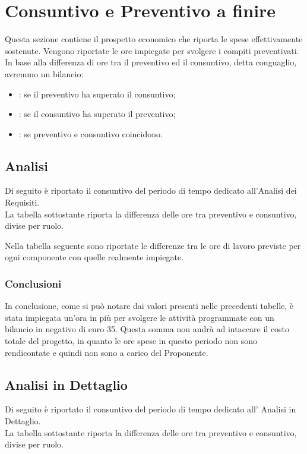 \section{Consuntivo e Preventivo a finire}
Questa sezione contiene il prospetto economico che riporta le spese effettivamente sostenute. Vengono riportate le ore impiegate per svolgere i compiti preventivati. In base alla differenza di ore tra il preventivo ed il consuntivo, detta conguaglio, avremmo un bilancio:
\begin{itemize}
\item {}: se il preventivo ha superato il consuntivo;
\item {}: se il consuntivo ha superato il preventivo;
\item {}: se preventivo e consuntivo coincidono.
\end{itemize}
\subsection{Analisi}
Di seguito è riportato il consuntivo del periodo di tempo dedicato all'Analisi dei Requisiti.\\
La tabella sottostante riporta la differenza delle ore tra preventivo e consuntivo, divise per ruolo.


Nella tabella seguente sono riportate le differenze tra le ore di lavoro previste per ogni componente con quelle realmente impiegate.


\subsubsection{Conclusioni}
In conclusione, come si può notare dai valori presenti nelle precedenti tabelle, è stata impiegata un'ora in più per svolgere le attività programmate con un bilancio in negativo di euro 35. Questa somma non andrà ad intaccare il costo totale del progetto, in quanto le ore spese in questo periodo non sono rendicontate e quindi non sono a carico del Proponente.

\subsection{Analisi in Dettaglio}
Di seguito è riportato il consuntivo del periodo di tempo dedicato all' Analisi in Dettaglio.\\
La tabella sottostante riporta la differenza delle ore tra preventivo e consuntivo, divise per ruolo.

